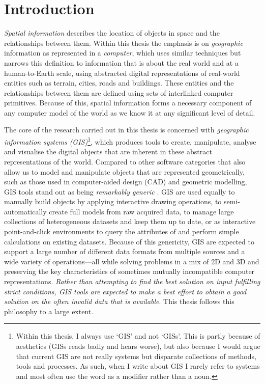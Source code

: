 
\chapter{Introduction}
\label{ch:introduction}


\emph{Spatial information} describes the location of objects in space and the relationships between them.
Within this thesis the emphasis is on \emph{geographic} information as represented in a \emph{computer}, which uses similar techniques but narrows this definition to information that is about the real world and at a human-to-Earth scale, using abstracted digital representations of real-world entities such as terrain, cities, roads and buildings.
These entities and the relationships between them are defined using sets of interlinked computer primitives.
Because of this, spatial information forms a necessary component of any computer model of the world as we know it at any significant level of detail.


The core of the research carried out in this thesis is concerned with \emph{geographic information systems (GIS)}\footnote{Within this thesis, I always use `GIS' and not `GISs'.
This is partly because of aesthetics (GISs reads badly and hears worse), but also because I would argue that current GIS are not really systems but disparate collections of methods, tools and processes.
As such, when I write about GIS I rarely refer to systems and most often use the word as a modifier rather than a noun.}, which produces tools to create, manipulate, analyse and visualise the digital objects that are inherent in these abstract representations of the world.
Compared to other software categories that also allow us to model and manipulate objects that are represented geometrically, such as those used in computer-aided design (CAD) and geometric modelling, GIS tools stand out as being \emph{remarkably generic} \citep{Coppock91,Gold06}.
GIS are used equally to manually build objects by applying interactive drawing operations, to semi-automatically create full models from raw acquired data, to manage large collections of heterogeneous datasets and keep them up to date, or as interactive point-and-click environments to query the attributes of and perform simple calculations on existing datasets.
Because of this genericity, GIS are expected to support a large number of different data formats from multiple sources and a wide variety of operations---all while solving problems in a mix of 2D and 3D and preserving the key characteristics of sometimes mutually incompatible computer representations.
\emph{Rather than attempting to find the best solution on input fulfilling strict conditions, GIS tools are expected to make a best effort to obtain a good solution on the often invalid data that is available}.
This thesis follows this philosophy to a large extent.

